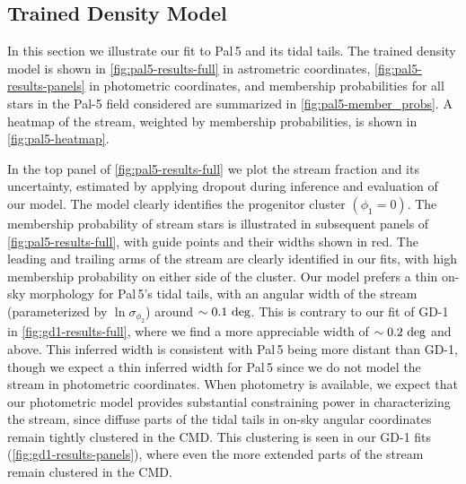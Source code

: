 \documentclass[twocolumn, linenumbers]{aastex631}
\newcommand{\stream}[1]{#1}
\begin{document}

    \subsection{Trained Density Model} \label{sub:results_pal5:results}

        In this section we illustrate our fit to \stream{Pal\,5} and its tidal tails. The trained density model is shown in
        \autoref{fig:pal5-results-full} in astrometric coordinates, 
        \autoref{fig:pal5-results-panels} in photometric coordinates, and membership probabilities for all stars in the Pal-5 field considered are summarized in \autoref{fig:pal5-member_probs}. A heatmap of the stream, weighted by membership probabilities, is shown in \autoref{fig:pal5-heatmap}.
        
        In the top panel of \autoref{fig:pal5-results-full} we plot the stream
        fraction and its uncertainty, estimated by applying dropout during
        inference and evaluation of our model. The model clearly identifies the
        progenitor cluster $(\phi_1 = 0)$. The membership probability of stream stars is illustrated in subsequent
        panels of \autoref{fig:pal5-results-full}, with guide points and their
        widths shown in red. The leading and trailing arms of the stream are
        clearly identified in our fits, with high membership probability on
        either side of the cluster. Our model prefers a thin on-sky morphology
        for \stream{Pal\,5}'s tidal tails, with an angular width of the stream
        (parameterized by $\ln{\sigma_{\phi_2}}$) around $\sim 0.1~\rm{deg}$.
        This is contrary to our fit of \stream{GD-1} in
        \autoref{fig:gd1-results-full}, where we find a more appreciable width
        of $\sim 0.2~\rm{deg}$ and above.  This inferred width is consistent
        with \stream{Pal\,5} being more distant than \stream{GD-1}, though we
        expect a thin inferred width for \stream{Pal\,5} since we do not model
        the stream in photometric coordinates. When photometry is available, we
        expect that our photometric model provides substantial constraining
        power in characterizing the stream, since diffuse parts of the tidal
        tails in on-sky angular coordinates remain tightly clustered in the CMD.
        This clustering is seen in our \stream{GD-1} fits
        (\autoref{fig:gd1-results-panels}), where even the more extended parts
        of the stream remain clustered in the CMD.
        
\end{document}
